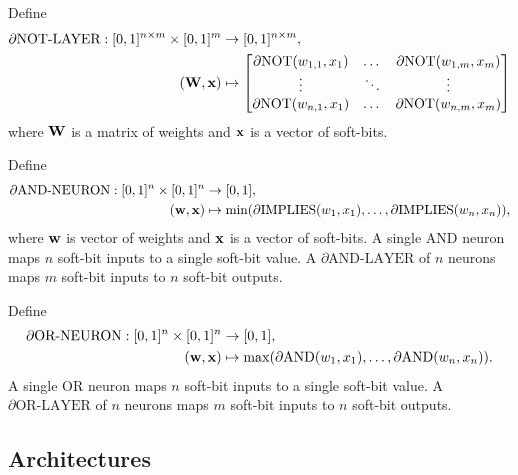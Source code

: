 \documentclass{article} %
\begin{document}
Define
\begin{equation*}
\begin{aligned}
\partial\text{NOT-LAYER}: [0,1]^{n \times m} \times [0,1]^{m} &\to [0,1]^{n \times m}, \\
({\bf W}, {\bf x}) &\mapsto 
\begin{bmatrix}
\partial\text{NOT}(w_{1,1}, x_{1}) & \dots & \partial\text{NOT}(w_{1,m}, x_{m}) \\
\vdots & \ddots & \vdots \\
\partial\text{NOT}(w_{n,1}, x_{1}) & \dots & \partial\text{NOT}(w_{n,m}, x_{m})
\end{bmatrix}
\end{aligned}
\end{equation*}
where ${\bf W}$ is a matrix of weights and ${\bf x}$ is a vector of soft-bits.


Define
\begin{equation*}
\begin{aligned}
\partial\text{AND-NEURON}: [0,1]^{n} \times [0,1]^{n} &\to [0,1], \\
({\bf w}, {\bf x}) &\mapsto \min(\partial\text{IMPLIES}(w_{1}, x_{1}), \dots, \partial\text{IMPLIES}(w_{n}, x_{n}))\text{,}
\end{aligned}
\end{equation*}
where ${\bf w}$ is vector of weights and ${\bf x}$ is a vector of soft-bits. A single AND neuron maps $n$ soft-bit inputs to a single soft-bit value. A $\partial\text{AND-LAYER}$ of $n$ neurons maps $m$ soft-bit inputs to $n$ soft-bit outputs.

Define
\begin{equation*}
\begin{aligned}
\partial\text{OR-NEURON}: [0,1]^{n} \times [0,1]^{n} &\to [0,1], \\
({\bf w}, {\bf x}) &\mapsto \max(\partial\text{AND}(w_{1}, x_{1}), \dots, \partial\text{AND}(w_{n}, x_{n}))\text{.}
\end{aligned}
\end{equation*}
A single OR neuron maps $n$ soft-bit inputs to a single soft-bit value. A $\partial\text{OR-LAYER}$ of $n$ neurons maps $m$ soft-bit inputs to $n$ soft-bit outputs.

\subsection{Architectures}
\end{document}
